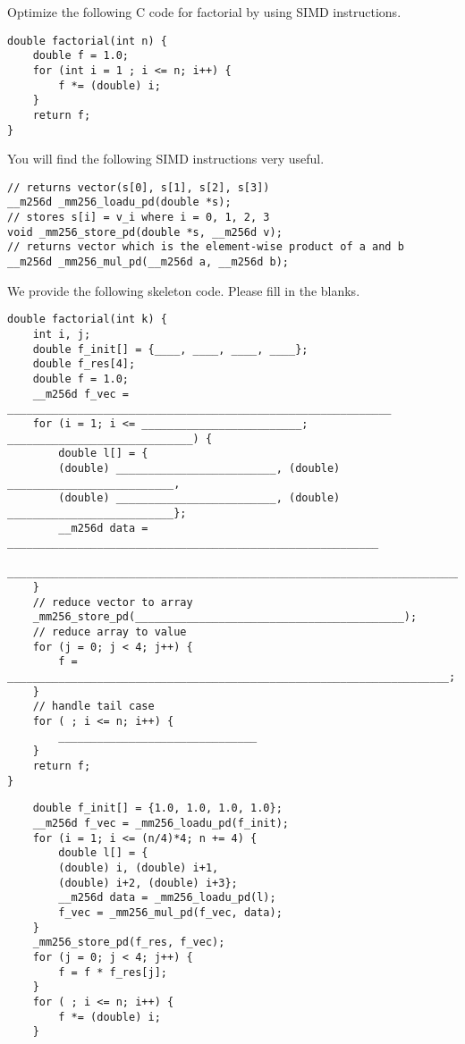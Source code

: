 \begin{blocksection}
\question
Optimize the following C code for factorial by using SIMD instructions.

\begin{verbatim}
double factorial(int n) {
    double f = 1.0;
    for (int i = 1 ; i <= n; i++) {
        f *= (double) i;
    }
    return f; 
}
\end{verbatim}

You will find the following SIMD instructions very useful.
\begin{verbatim}
// returns vector(s[0], s[1], s[2], s[3])
__m256d _mm256_loadu_pd(double *s);
// stores s[i] = v_i where i = 0, 1, 2, 3
void _mm256_store_pd(double *s, __m256d v);
// returns vector which is the element-wise product of a and b
__m256d _mm256_mul_pd(__m256d a, __m256d b);
\end{verbatim}

We provide the following skeleton code. Please fill in the blanks.

\begin{verbatim}
double factorial(int k) {
    int i, j;
    double f_init[] = {____, ____, ____, ____};
    double f_res[4];
    double f = 1.0;
    __m256d f_vec = ____________________________________________________________
    for (i = 1; i <= _________________________; _____________________________) {
        double l[] = {
        (double) _________________________, (double) __________________________,
        (double) _________________________, (double) __________________________};
        __m256d data = __________________________________________________________
        _________________________________________________________________________   
    }
    // reduce vector to array
    _mm256_store_pd(__________________________________________);
    // reduce array to value
    for (j = 0; j < 4; j++) {
        f = _____________________________________________________________________;
    }
    // handle tail case
    for ( ; i <= n; i++) {
        _______________________________
    }
    return f; 
}
\end{verbatim}

\end{blocksection}

\begin{solution}
\begin{verbatim}
    double f_init[] = {1.0, 1.0, 1.0, 1.0};
    __m256d f_vec = _mm256_loadu_pd(f_init);
    for (i = 1; i <= (n/4)*4; n += 4) {
        double l[] = {
        (double) i, (double) i+1,
        (double) i+2, (double) i+3};
        __m256d data = _mm256_loadu_pd(l);
        f_vec = _mm256_mul_pd(f_vec, data);   
    }
    _mm256_store_pd(f_res, f_vec);
    for (j = 0; j < 4; j++) {
        f = f * f_res[j];
    }
    for ( ; i <= n; i++) {
        f *= (double) i;
    }
\end{verbatim}
\end{solution}

